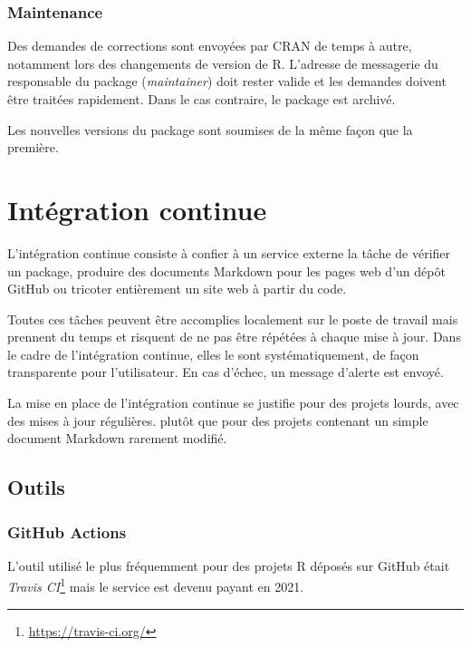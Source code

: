 \documentclass[
  12pt,
  french,
  a4paper,
  extrafontsizes,onecolumn,openright
  ]{memoir}
\begin{document}
\hypertarget{maintenance}{%
\subsection{Maintenance}\label{maintenance}}

Des demandes de corrections sont envoyées par CRAN de temps à autre, notamment lors des changements de version de R.
L'adresse de messagerie du responsable du package (\emph{maintainer}) doit rester valide et les demandes doivent être traitées rapidement.
Dans le cas contraire, le package est archivé.

Les nouvelles versions du package sont soumises de la même façon que la première.

\hypertarget{chap:ci}{%
\chapter{Intégration continue}\label{chap:ci}}

L'intégration continue consiste à confier à un service externe la tâche de vérifier un package, produire des documents Markdown pour les pages web d'un dépôt GitHub ou tricoter entièrement un site web à partir du code.

Toutes ces tâches peuvent être accomplies localement sur le poste de travail mais prennent du temps et risquent de ne pas être répétées à chaque mise à jour.
Dans le cadre de l'intégration continue, elles le sont systématiquement, de façon transparente pour l'utilisateur.
En cas d'échec, un message d'alerte est envoyé.

La mise en place de l'intégration continue se justifie pour des projets lourds, avec des mises à jour régulières.
plutôt que pour des projets contenant un simple document Markdown rarement modifié.

\hypertarget{outils}{%
\section{Outils}\label{outils}}

\hypertarget{github-actions}{%
\subsection{GitHub Actions}\label{github-actions}}

L'outil utilisé le plus fréquemment pour des projets R déposés sur GitHub était \emph{Travis CI}\footnote{\url{https://travis-ci.org/}} mais le service est devenu payant en 2021.
\end{document}
